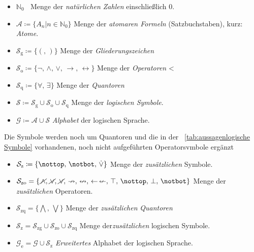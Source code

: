 \documentclass[english,ngerman,parskip=half,headsepline,footsepline]{scrreprt}
\newcommand{\ltrue}{\top}      %
\newcommand{\lnfalse}{\notbot} %
\newcommand{\lfalse}{\bot}     %
\newcommand{\lntrue}{\nottop}  %
\newcommand{\lleftimp}{\operatorname{\leftarrow}}      %
\newcommand{\limp}{\operatorname{\rightarrow}}         %
\newcommand{\lequiv}{\operatorname{\leftrightarrow}}   %
\newcommand{\lnand}{\operatorname{\cancel{\land}}}     %
\newcommand{\lnequiv}{\operatorname{\nleftrightarrow}} %
\newcommand{\lxor}{\operatorname{\dot{\lor}}}          %
\newcommand{\lnimp}{\operatorname{\nrightarrow}}       %
\newcommand{\lnleftimp}{\operatorname{\nleftarrow}}    %
\newcommand{\lnor}{\operatorname{\cancel{\lor}}}       %
\newcommand{\defeq}{\coloneqq}
\begin{document}
	\begin{itemize}

		\item $\mathbb{N}_0$ $\ $
		Menge der \emph{natürlichen Zahlen} einschließlich $0$.

		\item $\mathcal{A} \defeq \{A_n|n\in \mathbb{N}_0\}$
		Menge der \emph{atomaren Formeln} (Satzbuchstaben), kurz: \emph{Atome}.

		\item $\mathcal{S}_\mathrm{g} \defeq \{(,\,)\}$
		Menge der \emph{Gliederungszeichen}

		\item $\mathcal{S}_\mathrm{o} \defeq \{\lnot,\,\land,\,\lor,\,\limp,\,\lequiv\}$
		Menge der \emph{Operatoren}
<
		\item $\mathcal{S}_\mathrm{q} \defeq \{\forall,\,\exists\}$
		Menge der \emph{Quantoren}

		\item $\mathcal{S} \defeq \mathcal{S}_\mathrm{g}\cup\mathcal{S}_\mathrm{o}\cup\mathcal{S}_\mathrm{q}$
		Menge der \emph{logischen Symbole}.

		\item $\mathcal{G} \defeq \mathcal{A}\cup\mathcal{S}$
		\emph{Alphabet} der logischen Sprache.

	\end{itemize}
	Die Symbole werden noch um Quantoren und die in der \tablename~\vref{tab:aussagenlogische Symbole} vorhandenen, noch nicht aufgeführten Operatorsvmbole ergänzt
	\begin{itemize}

		\item $\mathcal{S}_\mathrm{z} \defeq \{\lntrue,\,\lnfalse,\,\lxor\}$
		Menge der \emph{zusätzlichen} Symbole.

		\item $\mathcal{S}_\mathrm{zo} =  \{\,\lnand,\,\lnor,\,\lnor,\,\lnimp,\,\lnequiv,\,
		\lleftimp \lnleftimp,\,
		\ltrue,\,\lntrue,\,\lfalse,\,\lnfalse\}$
		Menge der \emph{zusätzlichen} Operatoren.

		\item $\mathcal{S}_\mathrm{zq} = \{\bigwedge,\,\bigvee\}$
		Menge der \emph{zusätzlichen} \emph{Quantoren}

		\item $\mathcal{S}_\mathrm{z} = \mathcal{S}_\mathrm{zg}\cup\mathcal{S}_\mathrm{zo}\cup\mathcal{S}_\mathrm{zq}$
		Menge der\emph{zusätzlichen} logischen Symbole.

		\item $\mathcal{G}_\mathrm{e} = \mathcal{G}\cup\mathcal{S}_\mathrm{z}$
		\emph{Erweitertes} Alphabet der logischen Sprache.

	\end{itemize}
\end{document}
